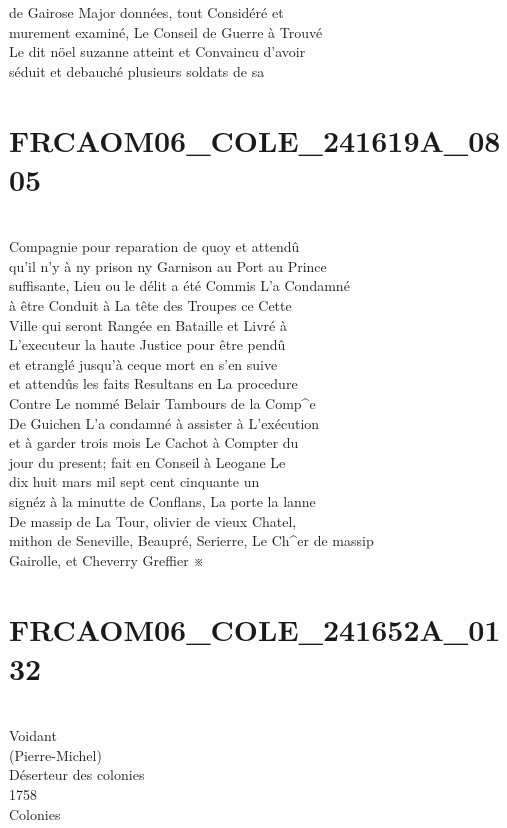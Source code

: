 \documentclass{article}
\begin{document}
\begin{pages}
de Gairose Major données, tout Considéré et\\
murement examiné, Le Conseil de Guerre à Trouvé\\
Le dit nöel suzanne atteint et Convaincu d'avoir\\
séduit et debauché plusieurs soldats de sa
\pend
\endnumbering\beginnumbering\section{FRCAOM06\_COLE\_241619A\_0805}\pstart
\\
Compagnie pour reparation de quoy et attendû\\
qu'il n'y à ny prison ny Garnison au Port au Prince\\
suffisante, Lieu ou le délit a été Commis L'a Condamné\\
à être Conduit à La tête des Troupes ce Cette\\
Ville qui seront Rangée en Bataille et Livré à\\
L'executeur la haute Justice pour être pendû\\
et etranglé jusqu'à ceque mort en s'en suive\\
et attendûs les faits Resultans en La procedure\\
Contre Le nommé Belair Tambours de la Comp\^{}e\\
De Guichen L'a condamné à assister à L'exécution\\
et à garder trois mois Le Cachot à Compter du\\
jour du present; fait en Conseil à Leogane Le\\
dix huit mars mil sept cent cinquante un\\
signéz à la minutte de Conflans, La porte la lanne\\
De massip de La Tour, olivier de vieux Chatel,\\
mithon de Seneville, Beaupré, Serierre, Le Ch\^{}er de massip\\
Gairolle, et Cheverry Greffier ※
\pend
\endnumbering\beginnumbering\section{FRCAOM06\_COLE\_241652A\_0132}\pstart
\\
Voidant\\
(Pierre-Michel)\\
Déserteur des colonies\\
1758\\
Colonies\\

\end{pages}
\end{document}
